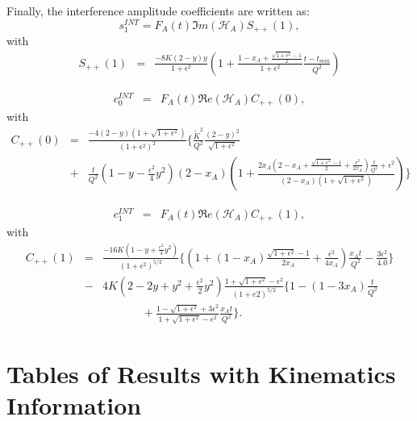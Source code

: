 \documentclass[aps,prc,preprint,superscriptaddress]{revtex4}
\begin{document}
Finally, the interference amplitude coefficients are written as:
\begin{equation}
s_{1}^{INT} = F_{A}(t) \Im m(\mathcal{H}_{A}) S_{++}(1),
\end{equation}
with
\begin{eqnarray}
   S_{++}(1) &=& \frac{-8K(2-y)y}{1+\epsilon^2} \left( 1 + 
\frac{1-x_A+\frac{\sqrt{1+\epsilon^2}-1}{2}}{1+\epsilon^2} 
\frac{t-t_{min}}{Q^{2}} \right) \label{eq:s1I}
\end{eqnarray}

\begin{eqnarray}
c_0^{INT} &=& F_A(t) \Re e(\mathcal{H}_{A}) C_{++}(0),
\end{eqnarray}
with \begin{eqnarray}  C_{++}(0) &=&
\frac{-4(2-y)(1+\sqrt{1+\epsilon^{2}})}{(1+\epsilon^{2})^2}  \bigg\{ 
   \frac{\widetilde{K}^2}{Q^2}  \frac{(2-y)^2}{\sqrt{1+\epsilon^{2}}} \, \\
   &+& \frac{t}{Q^2}  \left( 1 - y - \frac{\epsilon^2}{4} y^2 \right)  
(2-x_{A}) \left(  1 + \frac{2x_A(2-x_A + \frac{\sqrt{1+\epsilon^{2}}-1}{2} + 
\frac{\epsilon^{2}}{2x_A})\frac{t}{Q^2} + \epsilon^{2}}{(2-x_A) 
(1+\sqrt{1+\epsilon^{2}})}  \right)  \bigg\} \nonumber
 \label{eq:c0I} 
 \end{eqnarray}

\begin{eqnarray}
   c_1^{INT} &=&  F_A(t) \Re e(\mathcal{H}_{A}) C_{++}(1),
\end{eqnarray}
with  
   \begin{eqnarray}
   C_{++}(1) &=&
   \frac{-16K(1-y+\frac{\epsilon^{2}}{4}y^2)}{(1+\epsilon^{2})^{5/2}}\bigg\{\left(1+(1-x_A)\frac{\sqrt{1+\epsilon^{2}}-1}{2x_A} 
   + \frac{\epsilon^{2}}{4x_A}\right) 
\frac{x_At}{Q^2}-\frac{3\epsilon^{2}}{4.0} \bigg\} \nonumber \\&-& 4K \left( 
2-2y+y^2+\frac{\epsilon^{2}}{2}y^2\right)\frac{1+\sqrt{1+\epsilon^{2}}-\epsilon^{2}}{(1+e2)^{5/2}}
\bigg\{1-(1-3x_A)\frac{t}{Q^2}\nonumber\\&\,\,\,\,&\,\,\,\,\,\,\,\,\,\,\,\,\,\,\,\,\,\,\,\,\,+
\frac{1-\sqrt{1+\epsilon^{2}}+3\epsilon^{2}}{1+\sqrt{1+\epsilon^{2}}-\epsilon^{2}} 
\frac{x_A t}{Q^2}\bigg\}. \label{eq:c1I}
\end{eqnarray}


\section{Tables of Results with Kinematics Information}
\label{sec:fullresults}
\end{document}
